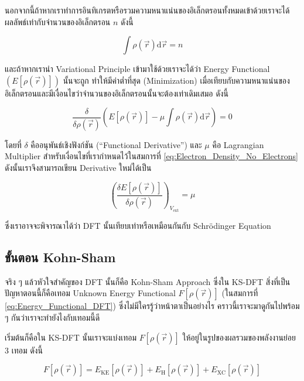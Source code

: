 นอกจากนี้ถ้าหากเราทำการอินทิเกรตหรือรวมความหนาแน่นของอิเล็กตรอนทั้งหมดเข้าด้วยเราจะได้ผลลัพธ์เท่ากับจำนวนของอิเล็กตรอน $n$ ดังนี้

\begin{equation}
    \label{eq:Electron_Density_No_Electrons}
    \int \rho(\vec{r}) \mathrm{d} \vec{r}
    =
    n
\end{equation}

\noindent และถ้าหากเรานำ Variational Principle เข้ามาใช้ด้วยเราจะได้ว่า Energy Functional $(E[\rho(\vec{r})])$ นั้นจะถูก%
ทำให้มีค่าต่ำที่สุด (Minimization) เมื่อเทียบกับความหนาแน่นของอิเล็กตรอนและมีเงื่อนไขว่าจำนวนของอิเล็กตรอนนั้นจะต้องเท่าเดิมเสมอ ดังนี้

\begin{equation}
    \label{eq:Energy_Functional_Minized}
    \frac
    {
        \delta
    }
    {
        \delta \rho(\vec{r})
    }
    \left(
    E[\rho(\vec{r})] - \mu \int \rho(\vec{r}) \mathrm{d} \vec{r}
    \right)
    = 0
\end{equation}

\noindent โดยที่ $\delta$ คืออนุพันธ์เชิงฟังก์ชัน (\enquote{Functional Derivative}) และ $\mu$ คือ Lagrangian Multiplier
สำหรับเงื่อนไขที่เรากำหนดไว้ในสมการที่ \eqref{eq:Electron_Density_No_Electrons} ดังนั้นเราจึงสามารถเขียน Derivative ใหม่ได้เป็น

\begin{equation}
    \left(\frac{\delta E[\rho(\vec{r})]}{\delta \rho(\vec{r})}\right)_{V_{\mathrm{ext}}} = \mu
\end{equation}

\noindent ซึ่งเราอาจจะพิจารณาได้ว่า DFT นั้นเทียบเท่าหรือเหมือนกันกับ Schr\"{o}dinger Equation

\subsection{ขั้นตอน Kohn-Sham}

จริง ๆ แล้วหัวใจสำคัญของ DFT นั้นก็คือ Kohn-Sham Approach ซึ่งใน KS-DFT สิ่งที่เป็นปัญหาตอนนี้ก็คือเทอม Unknown Energy Functional
$F[\rho(\vec{r})]$ (ในสมการที่ \eqref{eq:Energy_Functional_DFT}) ซึ่งไม่มีใครรู้ว่าหน้าตาเป็นอย่างไร คราวนี้เราจะมาดูกันไปพร้อม ๆ
กันว่าเราจะทำยังไงกับเทอมนี้ดี

เริ่มต้นก็คือใน KS-DFT นั้นเราจะแบ่งเทอม $F[\rho(\vec{r})]$ ให้อยู่ในรูปของผลรวมของพลังงานย่อย 3 เทอม ดังนี้

\begin{equation}
    F[\rho(\vec{r})]
    =
    E_{\text{KE}}[\rho(\vec{r})]
    + E_{\text{H}}[\rho(\vec{r})]
    + E_{\text{XC}}[\rho(\vec{r})]
\end{equation}

